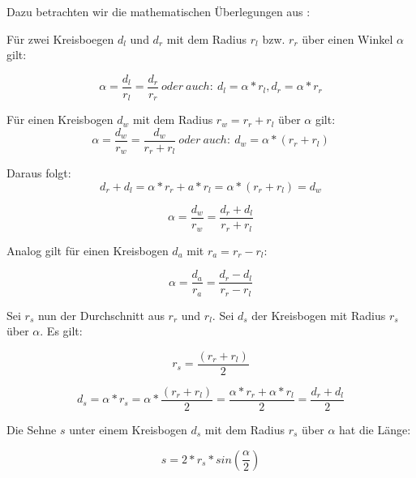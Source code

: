 \documentclass[11pt,a4paper]{article}
\begin{document}
Dazu betrachten wir die mathematischen Überlegungen aus \cite{website:dresden}:

Für zwei Kreisboegen $d_l$ und $d_r$ mit dem Radius $r_l$ bzw. $r_r$ über einen Winkel $\alpha$ gilt:

\begin{equation}\label{eq:one}
\alpha = \frac{d_l}{r_l} = \frac{d_r}{r_r}~oder~auch:~ d_l = \alpha * r_l, d_r = \alpha * r_r
\end{equation}

Für einen Kreisbogen $d_w$ mit dem Radius $r_w = r_r + r_l$ über $\alpha$ gilt: 
\begin{equation}\label{eq:two}
\alpha = \frac{d_w}{r_w} = \frac{d_w}{r_r+r_l}~oder~auch:~d_w = \alpha * (r_r + r_l)
\end{equation}

Daraus folgt: 
\begin{equation}
d_r + d_l = \alpha * r_r + a * r_l = \alpha * (r_r + r_l) = d_w
\end{equation}

\begin{equation}
\alpha = \frac{d_w}{r_w} = \frac{d_r+d_l}{r_r + r_l}
\end{equation}

Analog gilt für einen Kreisbogen $d_a$ mit $r_a = r_r - r_l$:

\begin{equation}
  \alpha = \frac{d_a}{r_a} = \frac{d_r-d_l}{r_r-r_l}
\end{equation}

Sei $r_s$ nun der Durchschnitt aus $r_r$ und $r_l$. Sei $d_s$ der Kreisbogen mit Radius $r_s$ über $\alpha$. Es gilt:

\begin{equation}
  r_s = \frac{(r_r + r_l)}{2}
\end{equation}

\begin{equation}
  d_s = \alpha * r_s = \alpha * \frac{(r_r + r_l)}{2} = \frac{\alpha * r_r + \alpha * r_l}{2} = \frac{d_r + d_l}{2}
\end{equation}

Die Sehne $s$ unter einem Kreisbogen $d_s$ mit dem Radius $r_s$ über $\alpha$ hat die Länge:

\begin{equation}
  s = 2 * r_s * sin(\frac{\alpha}{2})
\end{equation}
\end{document}

